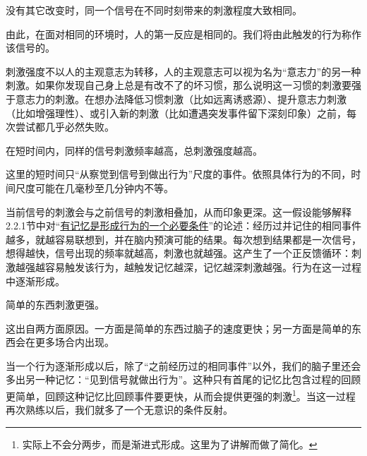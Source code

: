 没有其它改变时，同一个信号在不同时刻带来的刺激程度大致相同。
\begin{explain}
由此，在面对相同的环境时，人的第一反应是相同的。我们将由此触发的行为称作该信号的。

刺激强度不以人的主观意志为转移，人的主观意志可以视为名为“意志力”的另一种刺激。如果你发现自己身上总是有改不了的坏习惯，那么说明这一习惯的刺激要强于意志力的刺激。在想办法降低习惯刺激（比如远离诱惑源）、提升意志力刺激（比如增强理性）、或引入新的刺激（比如遭遇突发事件留下深刻印象）之前，每次尝试都几乎必然失败。
\end{explain}
在短时间内，同样的信号刺激频率越高，总刺激强度越高。
\begin{explain}
这里的短时间只“从察觉到信号到做出行为”尺度的事件。依照具体行为的不同，时间尺度可能在几毫秒至几分钟内不等。

当前信号的刺激会与之前信号的刺激相叠加，从而印象更深。这一假设能够解释2.2.1节中对“\hyperref[para:记忆]{有记忆是形成行为的一个必要条件}”的论述：经历过并记住的相同事件越多，就越容易联想到，并在脑内预演可能的结果。每次想到结果都是一次信号，想得越快，信号出现的频率就越高，刺激也就越强。这产生了一个正反馈循环：刺激越强越容易触发该行为，越触发记忆越深，记忆越深刺激越强。行为在这一过程中逐渐形成。
\end{explain}
简单的东西刺激更强。
\begin{explain}
这出自两方面原因。一方面是简单的东西过脑子的速度更快；另一方面是简单的东西会在更多场合内出现。

当一个行为逐渐形成以后，除了“之前经历过的相同事件”以外，我们的脑子里还会多出另一种记忆：“见到信号就做出行为”。这种只有首尾的记忆比包含过程的回顾更简单，回顾这种记忆比回顾事件要更快，从而会提供更强的刺激\footnote{实际上不会分两步，而是渐进式形成。这里为了讲解而做了简化。}。当这一过程再次熟练以后，我们就多了一个无意识的条件反射。
\end{explain}

